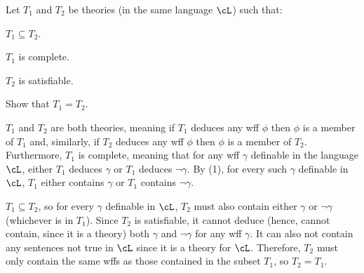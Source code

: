 \begin{problem}[2]
  Let $T_1$ and $T_2$ be theories (in the same language $\cL$) such that:
  \begin{enumroman}
    \item $T_1 \subseteq T_2$.
    \item $T_1$ is complete.
    \item $T_2$ is satisfiable.
  \end{enumroman}
  Show that $T_1 = T_2$.
\end{problem}
\begin{Answer}
  
  $T_1$ and $T_2$ are both theories, meaning if $T_1$ deduces any wff
  $\phi$ then $\phi$ is a member of $T_1$ and, similarly,
  if $T_2$ deduces any wff $\phi$ then $\phi$ is a member of $T_2$.
  Furthermore, $T_1$ is complete, meaning that for any wff $\gamma$ definable
  in the language $\cL$, either $T_1$ deduces $\gamma$ or $T_1$ deduces
  $\lnot \gamma$. By (1), for every such $\gamma$ definable in $\cL$,
  $T_1$ either contains $\gamma$ or $T_1$ contains $\lnot \gamma$.

  $T_1 \subseteq T_2$, so for every $\gamma$ definable in $\cL$,
  $T_2$ must also contain either $\gamma$ or $\lnot \gamma$
  (whichever is in $T_1$).
  Since $T_2$ is satisfiable, it cannot deduce
  (hence, cannot contain, since it is a theory) both $\gamma$ and $\lnot \gamma$
  for any wff $\gamma$. It can also not contain any sentences not
  true in $\cL$ since it is a theory for $\cL$.
  Therefore, $T_2$ must only contain the same wffs as those contained in
  the subset $T_1$, so $T_2 = T_1$.
\end{Answer}
